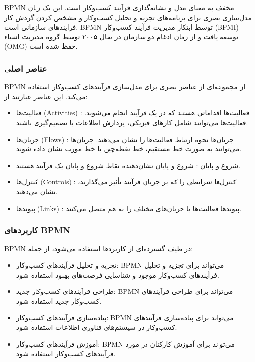 BPMN مخفف  به معنای مدل و نشانه‌گذاری فرآیند کسب‌وکار است. این یک زبان مدل‌سازی بصری برای برنامه‌های تجزیه و تحلیل کسب‌وکار و مشخص کردن گردش کار فرایندهای سازمانی است. BPMN توسط ابتکار مدیریت فرآیند کسب‌وکار (BPMI) توسعه یافت و از زمان ادغام دو سازمان در سال ۲۰۰۵ توسط گروه مدیریت اشیاء (OMG) حفظ شده ‌است.

\subsubsection*{عناصر اصلی}

BPMN از مجموعه‌ای از عناصر بصری برای مدل‌سازی فرآیندهای کسب‌وکار استفاده می‌کند. این عناصر عبارتند از:

\begin{itemize}
	\item فعالیت‌ها (Activities) : فعالیت‌ها اقداماتی هستند که در یک فرآیند انجام می‌شوند. فعالیت‌ها می‌توانند شامل کارهای فیزیکی، پردازش اطلاعات یا تصمیم‌گیری باشند.
	\item جریان‌ها (Flows) : جریان‌ها نحوه ارتباط فعالیت‌ها را نشان می‌دهند. جریان‌ها می‌توانند به صورت خط مستقیم، خط نقطه‌چین یا خط مورب نشان داده شوند.
	\item شروع و پایان  : شروع و پایان نشان‌دهنده نقاط شروع و پایان یک فرآیند هستند.
	\item کنترل‌ها (Controls) : کنترل‌ها شرایطی را که بر جریان فرآیند تأثیر می‌گذارند، نشان می‌دهند.
	\item پیوندها (Links) : پیوندها فعالیت‌ها یا جریان‌های مختلف را به هم متصل می‌کنند.
\end{itemize}

\subsubsection*{کاربردهای BPMN}

BPMN در طیف گسترده‌ای از کاربردها استفاده می‌شود، از جمله:

\begin{itemize}
	\item تجزیه و تحلیل فرآیندهای کسب‌وکار: BPMN می‌تواند برای تجزیه و تحلیل فرآیندهای کسب‌وکار موجود و شناسایی فرصت‌های بهبود استفاده شود.
	\item طراحی فرآیندهای کسب‌وکار جدید: BPMN می‌تواند برای طراحی فرآیندهای کسب‌وکار جدید استفاده شود.
	\item پیاده‌سازی فرآیندهای کسب‌وکار: BPMN می‌تواند برای پیاده‌سازی فرآیندهای کسب‌وکار در سیستم‌های فناوری اطلاعات استفاده شود.
	\item آموزش فرآیندهای کسب‌وکار: BPMN می‌تواند برای آموزش کارکنان در مورد فرآیندهای کسب‌وکار استفاده شود.
\end{itemize}

